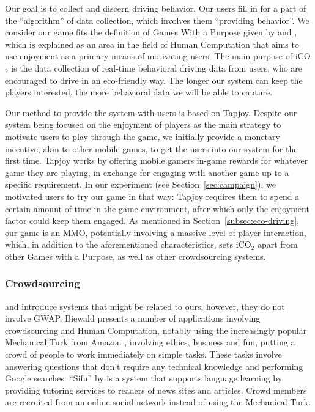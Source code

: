 \documentclass[preprint,authoryear,12pt]{elsarticle}
\begin{document}
Our goal is to collect and discern driving behavior. Our users fill in for a part of the ``algorithm'' of data collection, which involves them ``providing behavior''. 
We consider our game fits the definition of Games With a Purpose given by \cite{Quinn} and \cite{vonAhn2006Games}, which is explained as an area in the field of Human Computation that aims to use enjoyment as a primary means of motivating users. The main purpose of iCO$_2$ is the data collection of real-time behavioral driving data from users, who are encouraged to drive in an eco-friendly way. The longer our system can keep the players interested, the more behavioral data we will be able to capture. 



Our method to provide the system with users is based on Tapjoy. Despite our system being focused on the enjoyment of players as the main strategy to motivate users to play through the game, we initially provide a monetary incentive, akin to other mobile games, to get the users into our system for the first time. Tapjoy works by offering mobile gamers in-game rewards for whatever game they are playing, in exchange for engaging with another game up to a specific requirement. In our experiment (see Section~\ref{sec:campaign}), we motivated users to try our game in that way: Tapjoy requires them to spend a certain amount of time in the game environment, after which only the enjoyment factor could keep them engaged.
As mentioned in Section~\ref{subsec:eco-driving}, our game is an MMO, potentially involving a massive level of player interaction, which, in addition to the aforementioned characteristics, sets iCO$_2$ apart from other Games with a Purpose, as well as other crowdsourcing systems.


\subsubsection{Crowdsourcing}

\cite{Biewald:2012} and \citep{ChanH12} introduce systems that might be related to ours; however, they do not involve GWAP. Biewald presents a number of applications involving crowdsourcing and Human Computation, notably using the increasingly popular Mechanical Turk from Amazon \citep{MechTurk}, involving ethics, business and fun, putting a crowd of people to work immediately on simple tasks. These tasks involve answering questions that don't require any technical knowledge and performing Google searches. ``Sifu'' by \citep{ChanH12} is a system that supports language learning by providing tutoring services to readers of news sites and articles. Crowd members are recruited from an online social network instead of using the Mechanical Turk.
\end{document}
